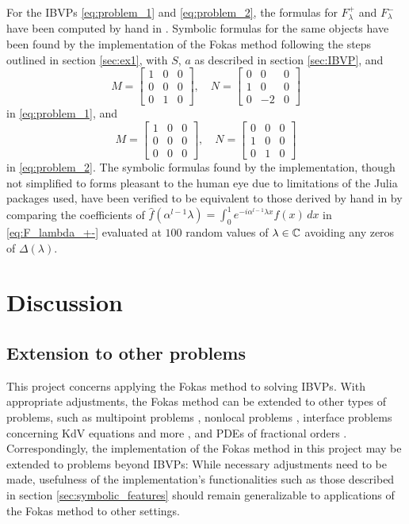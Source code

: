 \documentclass[12pt, oneside, a4paper]{article}
\begin{document}
For the IBVPs \eqref{eq:problem_1} and \eqref{eq:problem_2}, the formulas for $F_\lambda^+$ and $F_\lambda^-$ have been computed by hand in \cite[p. 1-4]{Smith2016}. Symbolic formulas for the same objects have been found by the implementation of the Fokas method following the steps outlined in section \ref{sec:ex1}, with $S$, $a$ as described in section \ref{sec:IBVP}, and
\[M = \begin{bmatrix}1 & 0 & 0\\ 0 & 0 & 0\\ 0 & 1 & 0\end{bmatrix},\quad N = \begin{bmatrix} 0 & 0 & 0\\ 1 & 0 & 0 \\ 0 & -2 & 0\end{bmatrix}\]
in \eqref{eq:problem_1}, and 
\[M = \begin{bmatrix}1 & 0 & 0\\ 0 & 0 & 0\\ 0 & 0 & 0\end{bmatrix},\quad N = \begin{bmatrix} 0 & 0 & 0\\ 1 & 0 & 0 \\ 0 & 1 & 0\end{bmatrix}\]
in \eqref{eq:problem_2}. The symbolic formulas found by the implementation, though not simplified to forms pleasant to the human eye due to limitations of the Julia packages used, have been verified to be equivalent to those derived by hand in \cite{Smith2016} by comparing the coefficients of $\hat{f}(\alpha^{l-1}\lambda) = \int_0^1 e^{-i\alpha^{l-1}\lambda x}f(x)\,dx$ in \eqref{eq:F_lambda_+-} evaluated at $100$ random values of $\lambda\in\mathbb C$ avoiding any zeros of $\Delta(\lambda)$.

\section{Discussion}\label{sec:discussion}

\subsection{Extension to other problems}

This project concerns applying the Fokas method to solving IBVPs. With appropriate adjustments, the Fokas method can be extended to other types of problems, such as multipoint problems \cite{Pelloni2018}, nonlocal problems \cite{Miller2018}, interface problems \cite{Deconinck2016} concerning KdV equations and more \cite{Shiels}, and PDEs of fractional orders \cite{Fernandez2018}. Correspondingly, the implementation of the Fokas method in this project may be extended to problems beyond IBVPs: While necessary adjustments need to be made, usefulness of the implementation's functionalities such as those described in section \ref{sec:symbolic_features} should remain generalizable to applications of the Fokas method to other settings.
\end{document}
